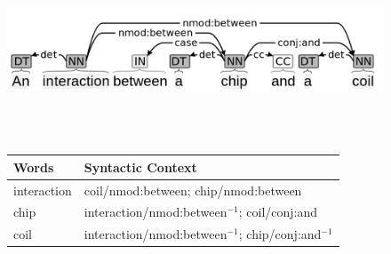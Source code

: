 \begin{figure}[!t]
 \begin{minipage}{\textwidth}
  \begin{minipage}{.9\textwidth}
    \centering
	\includegraphics[width=0.9\linewidth]{images/Chapitre2/exo1_dependences.png}
    \label{fig:exo1_dependences}
  \end{minipage}
  \\ 
  \\
  \begin{minipage}{.9\textwidth}
    \centering
		\begin{tabular}{@{}ll@{}}
		\toprule
		Words & Syntactic Context                        \\ \midrule
		interaction  &   coil/nmod:between; chip/nmod:between                   \\
		chip  & interaction/nmod:between$^{-1}$; coil/conj:and \\
		coil  & interaction/nmod:between$^{-1}$; chip/conj:and$^{-1}$      \\ \bottomrule
		\end{tabular}
		\label{tab:exo_deps_contxt}
    \end{minipage}
  \end{minipage}
\end{figure}

